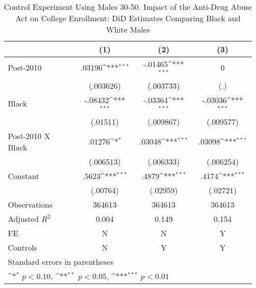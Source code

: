 \begin{table}[htbp]\centering
\def\sym#1{\ifmmode^{#1}\else\(^{#1}\)\fi}
\caption{Control Experiment Using Males 30-50. Impact of the Anti-Drug Abuse Act on College Enrollment: DiD Estimates Comparing Black and White Males}
\begin{tabular}{l*{3}{c}}
\hline\hline
                    &\multicolumn{1}{c}{(1)}         &\multicolumn{1}{c}{(2)}         &\multicolumn{1}{c}{(3)}         \\
\hline
Post-2010           &      .03196\sym{***}&     -.01465\sym{***}&           0         \\
                    &   (.003626)         &   (.003733)         &         (.)         \\
[1em]
Black               &     -.08432\sym{***}&     -.03364\sym{***}&     -.03036\sym{***}\\
                    &    (.01511)         &   (.009867)         &   (.009577)         \\
[1em]
Post-2010 X Black   &      .01276\sym{*}  &      .03048\sym{***}&      .03098\sym{***}\\
                    &   (.006513)         &   (.006333)         &   (.006254)         \\
[1em]
Constant            &       .5623\sym{***}&       .4879\sym{***}&       .4174\sym{***}\\
                    &    (.00764)         &    (.02959)         &    (.02721)         \\
\hline
Observations        &      364613         &      364613         &      364613         \\
Adjusted \(R^{2}\)  &       0.004         &       0.149         &       0.154         \\
FE                  &           N         &           N         &           Y         \\
Controls            &           N         &           Y         &           Y         \\
\hline\hline
\multicolumn{4}{l}{\footnotesize Standard errors in parentheses}\\
\multicolumn{4}{l}{\footnotesize \sym{*} \(p<0.10\), \sym{**} \(p<0.05\), \sym{***} \(p<0.01\)}\\
\end{tabular}
\end{table}
